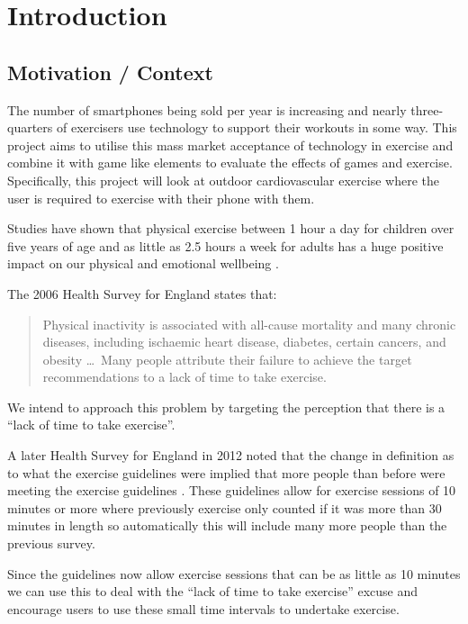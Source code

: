 \chapter{Introduction}\label{ch_intro}

\section{Motivation / Context}
The number of smartphones being sold per year is
increasing\cite{phones_gartner, phones_guardian} and nearly
three-quarters of exercisers use technology to support their
workouts in some way\cite{lifefitness}. This project aims to utilise
this mass market 
acceptance of technology in exercise and combine it with game like
elements to evaluate the effects of games and
exercise. Specifically, this project will look at outdoor
cardiovascular exercise where the user is required to exercise with
their phone with them.

Studies have shown that physical exercise
between 1 hour a day for children over five years of age and as
little as 2.5 hours a week for adults has a huge positive impact on
our physical and emotional wellbeing\cite{govsurvey, amsurvey} .

The 2006 Health Survey for England\cite{exercise} states that: 
\begin{quote}
  Physical inactivity is associated with all-cause mortality and
  many chronic diseases, including ischaemic heart disease, diabetes,
  certain cancers, and obesity \dots \ Many people attribute their
  failure to achieve the target recommendations to a lack of time to
  take exercise. 
\end{quote} 
We intend to approach this problem by targeting the perception that
there is a ``lack of time to take exercise''. 

A later Health Survey for England in 2012 noted that the change in
definition as to what the exercise guidelines were implied that more
people than before were meeting the exercise guidelines
\cite{exercise_2012}. These guidelines allow for exercise sessions of
10 minutes or more where previously exercise only counted if it was
more than 30 minutes in length so automatically this will include many
more people than the previous survey. 

Since the guidelines now allow exercise sessions that can be as little
as 10 minutes we can use this to deal with the ``lack of time to take
exercise'' excuse and encourage users to use these small time
intervals to undertake exercise. 

